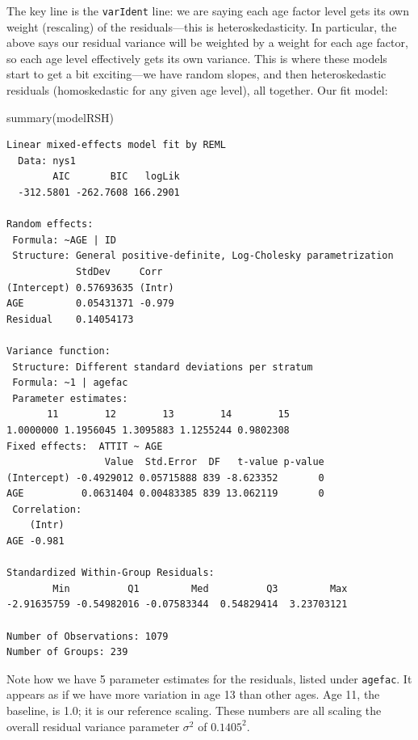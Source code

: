 \documentclass[
  letterpaper,
  DIV=11,
  numbers=noendperiod]{scrreprt}
\newenvironment{Shaded}{\begin{snugshade}}{\end{snugshade}}
\newcommand{\FunctionTok}[1]{\textcolor[rgb]{0.02,0.16,0.49}{#1}}
\newcommand{\NormalTok}[1]{\textcolor[rgb]{0.00,0.44,0.13}{#1}}
\begin{document}
The key line is the \texttt{varIdent} line: we are saying each age
factor level gets its own weight (rescaling) of the residuals---this is
heteroskedasticity. In particular, the above says our residual variance
will be weighted by a weight for each age factor, so each age level
effectively gets its own variance. This is where these models start to
get a bit exciting---we have random slopes, and then heteroskedastic
residuals (homoskedastic for any given age level), all together. Our fit
model:

\begin{Shaded}
\begin{Highlighting}[]
\FunctionTok{summary}\NormalTok{(modelRSH)}
\end{Highlighting}
\end{Shaded}

\begin{verbatim}
Linear mixed-effects model fit by REML
  Data: nys1 
        AIC       BIC   logLik
  -312.5801 -262.7608 166.2901

Random effects:
 Formula: ~AGE | ID
 Structure: General positive-definite, Log-Cholesky parametrization
            StdDev     Corr  
(Intercept) 0.57693635 (Intr)
AGE         0.05431371 -0.979
Residual    0.14054173       

Variance function:
 Structure: Different standard deviations per stratum
 Formula: ~1 | agefac 
 Parameter estimates:
       11        12        13        14        15 
1.0000000 1.1956045 1.3095883 1.1255244 0.9802308 
Fixed effects:  ATTIT ~ AGE 
                 Value  Std.Error  DF   t-value p-value
(Intercept) -0.4929012 0.05715888 839 -8.623352       0
AGE          0.0631404 0.00483385 839 13.062119       0
 Correlation: 
    (Intr)
AGE -0.981

Standardized Within-Group Residuals:
        Min          Q1         Med          Q3         Max 
-2.91635759 -0.54982016 -0.07583344  0.54829414  3.23703121 

Number of Observations: 1079
Number of Groups: 239 
\end{verbatim}

Note how we have 5 parameter estimates for the residuals, listed under
\texttt{agefac}. It appears as if we have more variation in age 13 than
other ages. Age 11, the baseline, is 1.0; it is our reference scaling.
These numbers are all scaling the overall residual variance parameter
\(\sigma^2\) of \(0.1405^2\).
\end{document}
